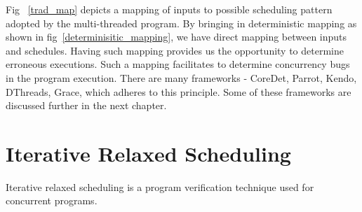 Fig~ \ref{trad_map} depicts a mapping of inputs to possible scheduling pattern adopted by the multi-threaded program. 
By bringing in deterministic mapping as shown in fig~\ref{determinisitic_mapping}, we have direct mapping between inputs and schedules. 
Having such mapping provides us the opportunity to determine erroneous executions. 
Such a mapping facilitates to determine concurrency bugs in the program execution. 
There are many frameworks - CoreDet\cite{coredet}, Parrot\cite{parrot}, Kendo\cite{kendo}, DThreads\cite{dthreads}, Grace\cite{grace}, which adheres to this principle. 
Some of these frameworks are discussed further in the next chapter.

\section{Iterative Relaxed Scheduling}

Iterative relaxed scheduling is a program verification technique used for concurrent programs. 
\citet{metzler2017quick}
